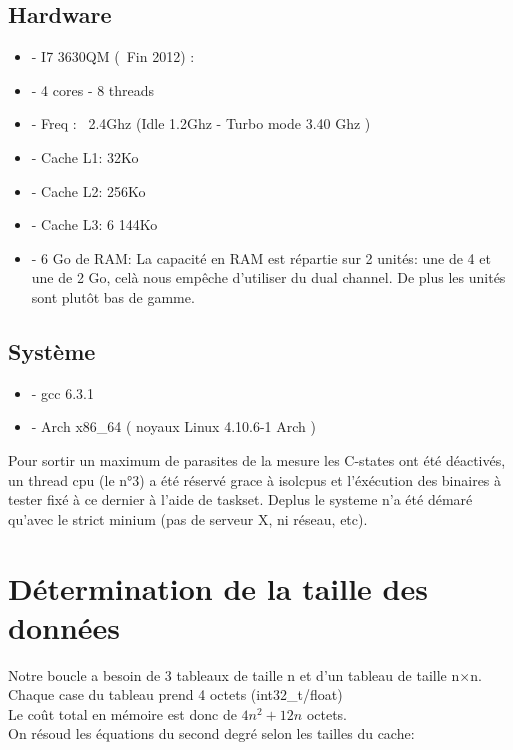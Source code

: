 \documentclass[a4paper]{report}
\begin{document}
\subsection*{Hardware}

\begin{itemize}
    \item{- I7 3630QM (~Fin 2012) :}
    \item{- 4 cores - 8 threads}
    \item{- Freq : ~2.4Ghz (Idle 1.2Ghz - Turbo mode 3.40 Ghz )}
    \item{- Cache L1: 32Ko}
    \item{- Cache L2: 256Ko}
    \item{- Cache L3: 6 144Ko}
    \item{- 6 Go de RAM:  La capacité en RAM est répartie sur 2 unités: une de 4 et une de 2 Go, celà nous empêche d'utiliser du dual channel. De plus les unités sont plutôt bas de gamme.}
\end{itemize}

\subsection*{Système}

\begin{itemize}
    \item{- gcc 6.3.1}
    \item{- Arch x86\_64 ( noyaux Linux 4.10.6-1 Arch )}
\end{itemize}
     Pour sortir un maximum de parasites de la mesure les C-states ont été déactivés, un thread cpu (le n°3) a été réservé grace à isolcpus et l'éxécution des binaires à tester fixé à ce dernier à l'aide de taskset. Deplus le systeme n'a été démaré qu'avec le strict minium (pas de serveur X, ni réseau, etc).

\section*{Détermination de la taille des données}

Notre boucle a besoin de 3 tableaux de taille n et d'un tableau de taille n$\times$n.\\
Chaque case du tableau prend 4 octets (int32\_t/float)\\
Le coût total en mémoire est donc de $4n^2+12n$ octets.\\

On résoud les équations du second degré selon les tailles du cache:\\
\end{document}

